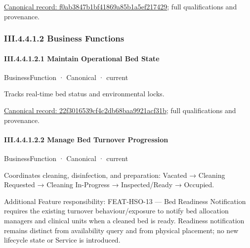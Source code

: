 {\footnotesize \href{../../../../continuum/business/business-service/f0ab3847b1bf41869a85b1a5ef217429.md}{Canonical record: f0ab3847b1bf41869a85b1a5ef217429}; full qualifications and provenance.}\par
\subsubsection*{III.4.4.1.2 Business Functions}
\label{navigation:III.4.4.1.2}

\paragraph*{III.4.4.1.2.1 Maintain Operational Bed State}
\label{navigation:III.4.4.1.2.1}

\label{element:22f3016539cf4c2db68baa9921acf31b}
{\small BusinessFunction · Canonical · current}\par

Tracks real-time bed status and environmental locks.


{\footnotesize \href{../../../../continuum/business/business-function/22f3016539cf4c2db68baa9921acf31b.md}{Canonical record: 22f3016539cf4c2db68baa9921acf31b}; full qualifications and provenance.}\par
\paragraph*{III.4.4.1.2.2 Manage Bed Turnover Progression}
\label{navigation:III.4.4.1.2.2}

\label{element:7637b9bcb38d4e3abbe01a59dc23f485}
{\small BusinessFunction · Canonical · current}\par

Coordinates cleaning, disinfection, and preparation: Vacated → Cleaning Requested → Cleaning In-Progress → Inspected/Ready → Occupied.



Additional Feature responsibility: FEAT-HSO-13 — Bed Readiness Notification requires the existing turnover behaviour/exposure to notify bed allocation managers and clinical units when a cleaned bed is ready. Readiness notification remains distinct from availability query and from physical placement; no new lifecycle state or Service is introduced.


